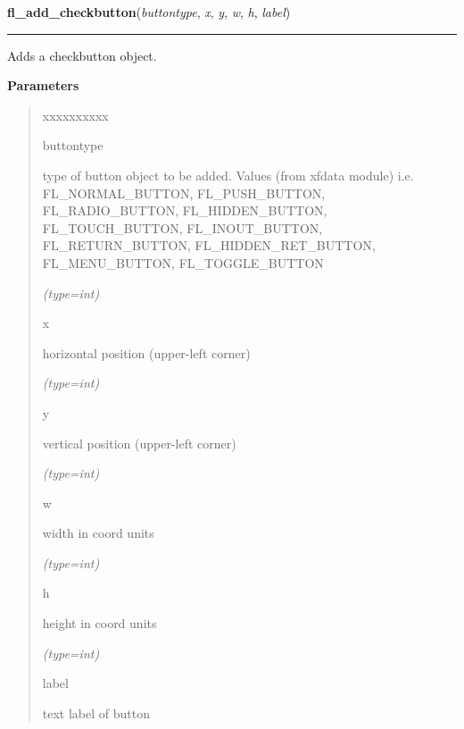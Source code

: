 \hspace{.8\funcindent}\begin{boxedminipage}{\funcwidth}

    \raggedright \textbf{fl\_add\_checkbutton}(\textit{buttontype}, \textit{x}, \textit{y}, \textit{w}, \textit{h}, \textit{label})

    \vspace{-1.5ex}

    \rule{\textwidth}{0.5\fboxrule}
\setlength{\parskip}{2ex}
    Adds a checkbutton object.

\setlength{\parskip}{1ex}
      \textbf{Parameters}
      \vspace{-1ex}

      \begin{quote}
        \begin{Ventry}{xxxxxxxxxx}

          \item[buttontype]

          type of button object to be added. Values (from xfdata module) 
          i.e. FL\_NORMAL\_BUTTON, FL\_PUSH\_BUTTON, FL\_RADIO\_BUTTON, 
          FL\_HIDDEN\_BUTTON, FL\_TOUCH\_BUTTON, FL\_INOUT\_BUTTON, 
          FL\_RETURN\_BUTTON, FL\_HIDDEN\_RET\_BUTTON, FL\_MENU\_BUTTON, 
          FL\_TOGGLE\_BUTTON

            {\it (type=int)}

          \item[x]

          horizontal position (upper-left corner)

            {\it (type=int)}

          \item[y]

          vertical position (upper-left corner)

            {\it (type=int)}

          \item[w]

          width in coord units

            {\it (type=int)}

          \item[h]

          height in coord units

            {\it (type=int)}

          \item[label]

          text label of button


\end{Ventry}
\end{quote}
\end{boxedminipage}
